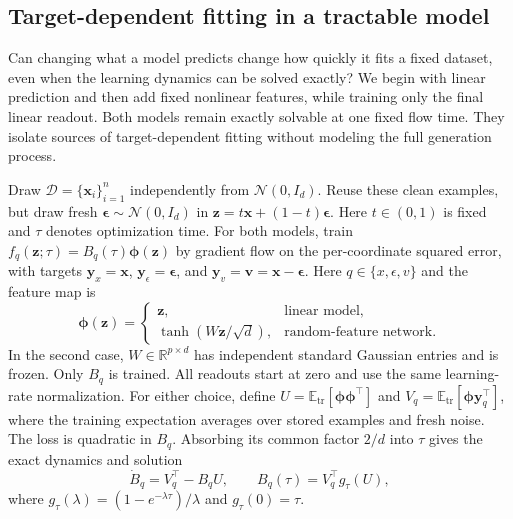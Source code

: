 \subsection{Target-dependent fitting in a tractable model}
\label{sec:linear_theory}

Can changing what a model predicts change how quickly it fits a fixed dataset,
even when the learning dynamics can be solved exactly? We begin with linear
prediction and then add fixed nonlinear features, while training only the
final linear readout. Both models remain exactly solvable at one fixed flow
time. They isolate sources of target-dependent fitting without modeling the
full generation process.

Draw $\mathcal D=\{\mathbf x_i\}_{i=1}^n$ independently from
$\mathcal N(0,I_d)$. Reuse these clean examples, but draw fresh
$\boldsymbol\epsilon\sim\mathcal N(0,I_d)$ in
$\mathbf z=t\mathbf x+(1-t)\boldsymbol\epsilon$.
Here $t\in(0,1)$ is fixed and $\tau$ denotes optimization time.
For both models, train $f_q(\mathbf z;\tau)=B_q(\tau)\boldsymbol\phi(\mathbf z)$
by gradient flow on the per-coordinate squared error, with targets
$\mathbf y_x=\mathbf x$, $\mathbf y_\epsilon=\boldsymbol\epsilon$, and
$\mathbf y_v=\mathbf v=\mathbf x-\boldsymbol\epsilon$.
Here $q\in\{x,\epsilon,v\}$ and the feature map is
\[
 \boldsymbol\phi(\mathbf z)=
 \begin{cases}
 \mathbf z,&\text{linear model},\\
 \tanh(W\mathbf z/\sqrt d),&\text{random-feature network}.
 \end{cases}
\]
In the second case, $W\in\mathbb R^{p\times d}$ has independent standard
Gaussian entries and is frozen. Only $B_q$ is trained.
All readouts start at zero and use the same learning-rate normalization.
For either choice, define
$U=\mathbb E_{\mathrm{tr}}[\boldsymbol\phi\boldsymbol\phi^\top]$ and
$V_q=\mathbb E_{\mathrm{tr}}[\boldsymbol\phi\mathbf y_q^\top]$,
where the training expectation averages over stored examples and fresh noise.
The loss is quadratic in $B_q$. Absorbing its common factor $2/d$ into
$\tau$ gives the exact dynamics and solution
\begin{equation}
 \dot B_q=V_q^\top-B_qU,\qquad
 B_q(\tau)=V_q^\top g_\tau(U),
 \label{eq:main_feature_solution}
\end{equation}
where $g_\tau(\lambda)=(1-e^{-\lambda\tau})/\lambda$ and $g_\tau(0)=\tau$.

